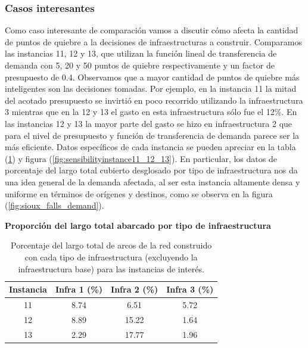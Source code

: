 \documentclass{article}
\begin{document}
  \subsubsection*{Casos interesantes}

  Como caso interesante de comparación vamos a discutir cómo afecta la cantidad de puntos de quiebre a la decisiones de infraestructuras a construir. Comparamos las instancias 11, 12 y 13, que utilizan la función lineal de transferencia de demanda con 5, 20 y 50 puntos de quiebre respectivamente y un factor de presupuesto de 0.4. Observamos que a mayor cantidad de puntos de quiebre más inteligentes son las decisiones tomadas. Por ejemplo, en la instancia 11 la mitad del acotado presupuesto se invirtió en poco recorrido utilizando la infraestructura 3 mientras que en la 12 y 13 el gasto en esta infraestructura sólo fue el 12\%. En las instancias 12 y 13 la mayor parte del gasto se hizo en infraestructura 2 que para el nivel de presupuesto y función de transferencia de demanda parece ser la más eficiente. Datos específicos de cada instancia se pueden apreciar en la tabla (\ref{table:sensibilityinfralengths}) y figura (\ref{fig:sensibilityinstance11_12_13}). En particular, los datos de porcentaje del largo total cubierto desglosado por tipo de infraestructura nos da una idea general de la demanda afectada, al ser esta instancia altamente densa y uniforme en términos de orígenes y destinos, como se observa en la figura (\ref{fig:sioux_falls_demand}).

  \begin{table}[h!]
    \centering
    \caption*{{\bf Proporción del largo total abarcado por tipo de infraestructura}}
    \begin{tabular}{cccc}
      \toprule
        Instancia & Infra 1 (\%) & Infra 2 (\%) & Infra 3 (\%) \\
      \midrule
        11 & 8.74  & 6.51   & 5.72 \\
        12 & 8.89  & 15.22  & 1.64 \\
        13 & 2.29  & 17.77  & 1.96 \\
      \bottomrule
    \end{tabular}
      \caption{Porcentaje del largo total de arcos de la red construido con cada tipo de infraestructura (excluyendo la infraestructura base) para las instancias de interés.}\label{table:sensibilityinfralengths}
  \end{table}
\end{document}
